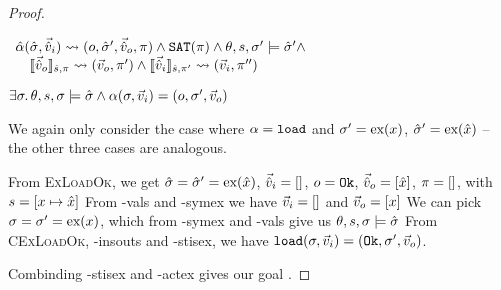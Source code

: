 \begin{proof}


\pfassume \begin{hypvlist}
 $
\begin{array}{l}
\ppexec{\hat\alpha}{\sst,\sins}{o,\sst',\souts, \pc} \land \SAT(\pc) \land \theta,s,\st'\models\sst' \land \\
\quad \expeval[\hat s,\pc]{\souts}\rightsquigarrow(\outs,\pc')\land \expeval[\hat s,\pc']{\sins}\rightsquigarrow(\ins,\pc'')
\end{array}
$
\end{hypvlist}
\pfprove \begin{goalvlist}
 $\exists \st\ldotp \theta,s,\st\models\sst \land \ppexecc{\alpha}{\st,\ins}{o,\st',\outs}$
\end{goalvlist}

We again only consider the case where $\alpha=\load$ and $\st'=\ex{x}$, $\sst'=\ex{\sym x}$ -- the other three cases are analogous.
\begin{hypvlist}
 From \textsc{ExLoadOk}, we get $\sst=\sst'=\ex{\sym x}$, $\sins=[]$, $o=\Ok$, $\souts=[\sym x]$, $\pc=[]$, with $s=[x\mapsto \sym x]$
 From \hyp{vals} and \hyp{symex} we have $\ins=[]$ and $\outs=[x]$
 We can pick $\st=\st'=\ex{x}$, which from \hyp{symex} and \hyp{vals} give us $\theta,s,\st\models\sst$
 From \textsc{CExLoadOk}, \hyp{insouts} and \hyp{stisex}, we have $\ppexecc{\load}{\st,\ins}{\Ok,\st',\outs}$.
\end{hypvlist}
Combinding \hyp{stisex} and \hyp{actex} gives our goal .


\end{proof}
